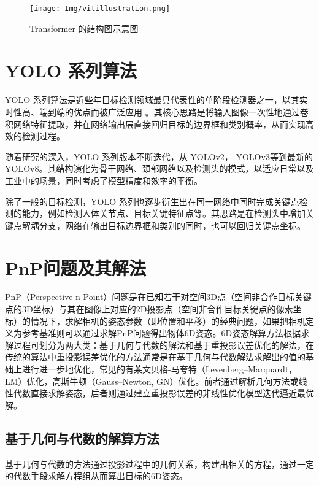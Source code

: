 \begin{figure}[!htb]
	\centering
	\texttt{[image: Img/vitillustration.png]}
	\caption{Transformer 的结构图示意图}
	\label{fig:transformer_arch}
\end{figure}


\section{YOLO 系列算法}
\label{sec:yolo_keypoint}

YOLO 系列算法是近些年目标检测领域最具代表性的单阶段检测器之一，以其实时性高、端到端的优点而被广泛应用 \cite{yolo2016you,yolov3}。其核心思路是将输入图像一次性地通过卷积网络特征提取，并在网络输出层直接回归目标的边界框和类别概率，从而实现高效的检测过程。

随着研究的深入，YOLO 系列版本不断迭代，从 YOLOv2\cite{yolov2}， YOLOv3\cite{yolov3}等到最新的 YOLOv8\cite{yolov8_ultralytics}。其结构演化为骨干网络、颈部网络以及检测头的模式，以适应日常以及工业中的场景，同时考虑了模型精度和效率的平衡。

除了一般的目标检测，YOLO 系列也逐步衍生出在同一网络中同时完成关键点检测的能力，例如检测人体关节点、目标关键特征点等。其思路是在检测头中增加关键点解耦分支，网络在输出目标边界框和类别的同时，也可以回归关键点坐标。




\section{PnP问题及其解法}
PnP（Perspective-n-Point）问题是在已知若干对空间3D点（空间非合作目标关键点的3D坐标）与其在图像上对应的2D投影点（空间非合作目标关键点的像素坐标）的情况下，求解相机的姿态参数（即位置和平移）的经典问题，如果把相机定义为参考基准则可以通过求解PnP问题得出物体6D姿态。6D姿态解算方法根据求解过程可划分为两大类：基于几何与代数的解法\cite{p3p, EPnP}和基于重投影误差优化的解法\cite{Chen_2022_CVPR,Lipson_2022_CVPR,hu2022perspective}，在传统的算法中重投影误差优化的方法通常是在基于几何与代数解法求解出的值的基础上进行进一步地优化，常见的有莱文贝格-马夸特（Levenberg–Marquardt，LM）优化，高斯牛顿（Gauss–Newton, GN）优化。前者通过解析几何方法或线性代数直接求解姿态，后者则通过建立重投影误差的非线性优化模型迭代逼近最优解。
\subsection{基于几何与代数的解算方法}
基于几何与代数的方法通过投影过程中的几何关系，构建出相关的方程，通过一定的代数手段求解方程组从而算出目标的6D姿态。
